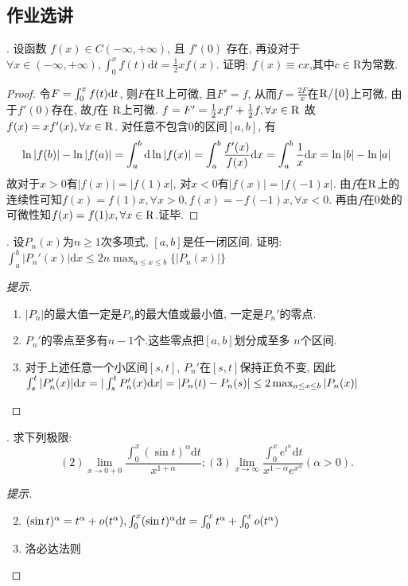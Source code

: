 \documentclass[a4paper,12pt]{article}
\begin{document}
\subsection*{作业选讲}

. 设函数 $f(x)\in C(-\infty,+\infty)$, 且 $f'(0)$ 存在, 再设对于
$\forall x\in(-\infty,+\infty),\int_0^xf(t)\mathrm{d}t=\frac{1}{2}xf(x)$.
证明: $f(x)\equiv cx$,其中$c\in\mathrm{R}$为常数.
\begin{proof}
  令$F=\int_0^xf(t)\mathrm{d} t$, 则$F$在$\mathrm{R}$上可微, 且$F'=f$,
  从而$f=\frac{2F}{x}$在$\mathrm{R}/\{0\}$上可微, 由于$f'(0)$存在, 故$f$在
  $\mathrm{R}$上可微. $f=F'=\frac{1}{2}xf'+\frac{1}{2}f, \forall x\in\mathrm{R}$
  故$f(x)=xf'(x),\forall x\in\mathrm{R}$. 对任意不包含$0$的区间$[a,b]$, 有
  \[\ln |f(b)|-\ln |f(a)|=\int_a^b\mathrm{d} \ln |f(x)|=\int_a^b\frac{f'(x)}{f(x)}\mathrm{d} x=\int_a^b\frac{1}{x}\mathrm{d} x=\ln |b|-\ln |a|\]
  故对于$x>0$有$|f(x)|=|f(1)x|$, 对$x<0$有$|f(x)|=|f(-1)x|$. 由$f$在$\mathrm{R}$上的连续性可知$f(x)=f(1)x,\forall x>0,f(x)=-f(-1)x,\forall x<0$. 再由$f$在$0$处的可微性知$f(x)=f(1)x,\forall x\in\mathrm{R}$.证毕.
\end{proof}

. 设$P_n(x)$为$n\geq1$次多项式, $[a,b]$是任一闭区间. 证明:
\(\int_a^b|P_n'(x)|\mathrm{d}x\leq2n\max_{a\leq x\leq b}\{|P_n(x)|\}\)
\begin{proof}[提示]
  \ 
  \begin{enumerate}
    \item $|P_n|$的最大值一定是$P_n$的最大值或最小值, 一定是$P_n'$的零点.
    \item $P_n'$的零点至多有$n-1$个.这些零点把$[a,b]$划分成至多
      $n$个区间.
    \item 对于上述任意一个小区间$[s,t]$, $P_n'$在$[s,t]$保持正负不变, 因此$\int_s^t|P_n'(x)|\mathrm{d} x=|\int_s^tP_n'(x)\mathrm{d} x|=|P_n(t)-P_n(s)|\leq 2\max_{a\leq x\leq b}|P_n(x)|$
  \end{enumerate}
\end{proof}

. 求下列极限:
\[
(2)\lim_{x\to0+0}\frac{\int_0^x(\sin t)^\alpha\mathrm{d}t}{x^{1+\alpha}};
(3)\lim_{x\to\infty}\frac{\int_0^xe^{t^\alpha}\mathrm{d}t}{x^{1-\alpha}e^{x^\alpha}}(\alpha>0).
\]
\begin{proof}[提示]
  \ 
  \begin{enumerate}
    \setcounter{enumi}{1}
  \item $(\sin t)^\alpha=t^\alpha+o(t^\alpha), \int_0^x(\sin t)^\alpha\mathrm{d} t=\int_0^xt^\alpha+\int_0^xo(t^\alpha)$
    \item 洛必达法则
  \end{enumerate}
\end{proof}
\end{document}
